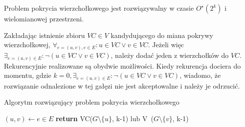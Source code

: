 \begin{theorem}
  Problem pokrycia wierzchołkowego jest rozwiązywalny w czasie $O^{\star}(2^k)$
  i wielomianowej przestrzeni.
\end{theorem}
\begin{bproof}
  Zakładając istnienie zbioru $VC \in V$ kandydującego do miana pokrywy 
  wierzchołkowej, $\forall_{e=(u,v), e \in E}: u \in VC \lor v \in VC$.
  Jeżeli więc $\exists_{e=(u,v) \in E}: \neg(u \in VC \lor v \in VC)$, należy
  dodać jeden z wierzchołków do $VC$. 
  Rekurencyjnie realizowane są obydwie możliwości.
  Kiedy rekurencja dociera do momentu, gdzie $k=0, \exists_{e=(u,v) \in E}:
  \neg(u \in VC \lor v \in VC)$, wiadomo, że rozwiązanie odnalezione w tej
  gałęzi nie jest akceptowalne i należy je odrzucić.

  \begin{algorithm}
    \caption{Algorytm rozwiązujący problem pokrycia wierzchołkowego}\label{alg_VC1}
    \begin{algorithmic}[1]
    \EndIf
  \EndIf
  \State $(u,v) \leftarrow e \in E$
  \State \textbf{return} {VC($G\setminus \{u\}$, k-1) lub V~($G\setminus \{v\}$, k-1)}
\EndFunction
\end{algorithmic}
\end{algorithm}
\end{bproof}
